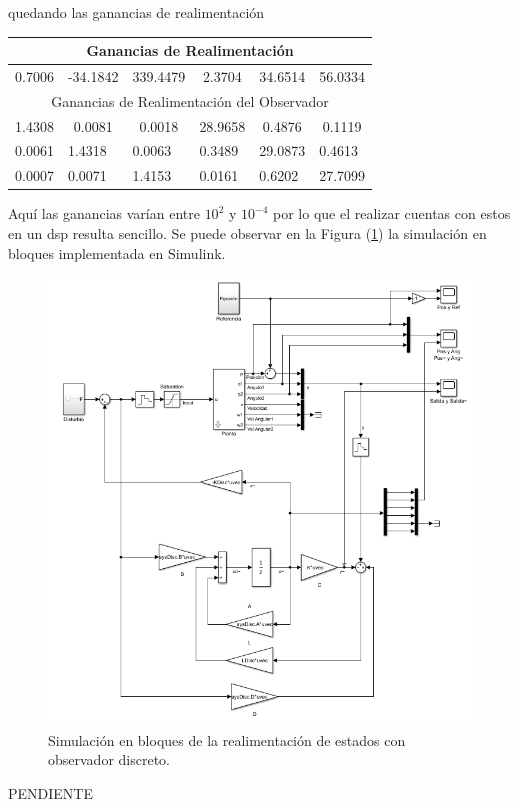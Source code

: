 quedando las ganancias de realimentación

\begin{table}[H]
\centering
\begin{tabular}{@{}clllll@{}}
\toprule
\multicolumn{6}{c}{Ganancias de Realimentación}                           \\ \midrule
0.7006 & \multicolumn{1}{c}{-34.1842} & \multicolumn{1}{c}{339.4479} & \multicolumn{1}{c}{2.3704}  & \multicolumn{1}{c}{34.6514} & \multicolumn{1}{c}{56.0334} \\ \midrule
\multicolumn{6}{c}{Ganancias de Realimentación del Observador}            \\ \midrule
1.4308 & \multicolumn{1}{c}{0.0081}   & \multicolumn{1}{c}{0.0018}   & \multicolumn{1}{c}{28.9658} & \multicolumn{1}{c}{0.4876}  & \multicolumn{1}{c}{0.1119}  \\
\multicolumn{1}{l}{0.0061} & 1.4318 & 0.0063 & 0.3489 & 29.0873 & 0.4613  \\
\multicolumn{1}{l}{0.0007} & 0.0071 & 1.4153 & 0.0161 & 0.6202  & 27.7099 \\ \bottomrule
\end{tabular}
\end{table}
Aquí las ganancias varían entre $10^2$ y $10^{-4}$ por lo que el realizar cuentas con estos en un dsp resulta sencillo.
Se puede observar en la Figura (\ref{fig:obsv_disc}) la simulación en bloques implementada en Simulink.

\begin{figure}[H]
	\centering
	\includegraphics[width=\linewidth]{../Modelo de Control/ImagenesModelo de Control/obsv_disc.png}
	\caption{Simulación en bloques de la realimentación de estados con observador discreto.}	
	\label{fig:obsv_disc}
\end{figure}


PENDIENTE

%